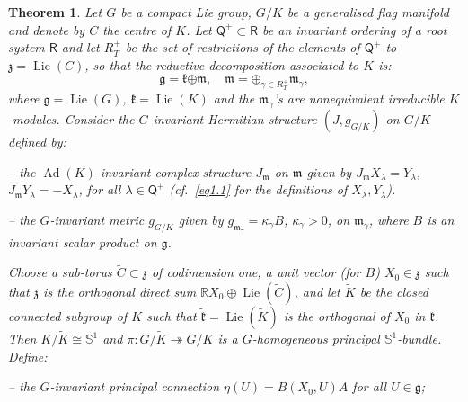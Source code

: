 \documentclass[a4paper,reqno]{amsart}
\theoremstyle{definition}
\theoremstyle{remark}
\theoremstyle{plain}
\newtheorem{mainthm}{Theorem}
\numberwithin{equation}{section}
\newcommand{\R}{{\mathbb{R}}}
\newcommand{\bbS}{{\mathbb{S}}}
\newcommand{\g}{{\mathfrak{g}}}  %
\newcommand{\fm}{{\mathfrak{m}}}
\newcommand{\fk}{{\mathfrak{k}}}  \renewcommand{\k}{{\mathfrak{k}}}
\newcommand{\fz}{{\mathfrak{z}}}
\newcommand{\sto}{\twoheadrightarrow}
\def\Lie{\operatorname {Lie}}
\DeclareMathOperator{\Ad}{{Ad}}
\def\boplus{\mathbin{\boldsymbol{\oplus}}}
\newcommand{\roots}{\mathsf{R}}
\newcommand{\rootsQ}{\mathsf{Q}}
\newcommand{\prootsQ}{\mathsf{Q}^+}
\newcommand{\wK}{{\widetilde{K}}}
\newcommand{\wk}{{\widetilde{\mathfrak{k}}}}
\newcommand{\wpzero}{{\tilde{p}_0}}
\begin{document}

\begin{mainthm}
  \label{thmA}
  Let $G$ be a compact Lie group, $G/K$ be a generalised flag
  manifold and denote by $C$ the centre of $K$.  Let
  $\rootsQ^+ \subset \roots$ be an invariant ordering of a root
  system $\roots$ and let  $R_T^+$ be the set of restrictions of the
  elements of $\rootsQ^+$ to $\fz = \Lie(C)$, so that the reductive
  decomposition associated to $K$ is:
    \[
    \textstyle{\g= \fk \boplus \fm, \quad \fm = \boplus_{\gamma
        \in R_T^+} \fm_\gamma,}
    \]
    where $\g=\Lie(G)$, $\fk = \Lie(K)$ and the $\fm_\gamma$'s are
    nonequivalent irreducible $K$-modules.  Consider the
    $G$-invariant Hermitian structure $(J,g_{\scriptscriptstyle{G/K}})$ on $G/K$ defined
    by:

    -- the $\Ad(K)$-invariant complex structure $J_\fm$
   on $\fm$  given by 
   $J_\fm X_\lambda= Y_\lambda$, $J_\fm Y_\lambda = - X_\lambda$,
   for all $\lambda \in \prootsQ$ (cf.~\eqref{eq1.1} for the
   definitions of $X_\lambda, Y_\lambda$).

 --  the $G$-invariant metric $g_{\scriptscriptstyle{G/K}}$ given by  $g_{\fm_\gamma} =
 \kappa_\gamma B$, $\kappa_\gamma >0$, on $\fm_\gamma$, where $B$ is an invariant
 scalar product on $\g$.

 Choose a sub-torus $\widetilde{C} \subset
 \fz$ of codimension one, a unit vector (for $B$) $X_0 \in
 \fz$ %
 such that $\fz$ is the orthogonal direct sum  $\R
 X_0 \oplus \Lie(\widetilde{C})$, and
 let $\wK$ be the closed connected subgroup of
 $K$ such that $\wk= \Lie(\wK)$ is the orthogonal of
 $X_0$ in $\fk$. Then $K/\wK \cong \bbS^1$ and $\pi : G/\wK \sto
 G/K$ is a $G$-homogeneous principal $\bbS^1$-bundle. %
 Define:

  -- the $G$-invariant principal connection
 $\eta(U) = B(X_0,U)A $ for all $U \in \g$; %


\end{mainthm}
\end{document}
